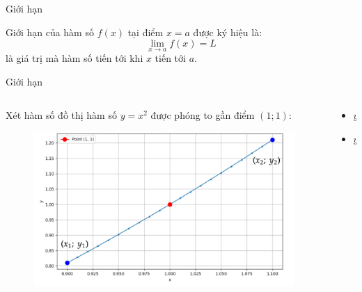 \begin{frame}{Giới hạn}
    \begin{tcolorbox}[colback=blue!10, colframe=blue!50!black, title=Định nghĩa]
    Giới hạn của hàm số \(f(x)\) tại điểm \(x=a\) được ký hiệu là:
    \begin{equation}
        \lim_{x \to a} f(x) = L
    \end{equation}
    là giá trị mà hàm số tiến tới khi \(x\) tiến tới \(a\).
    \end{tcolorbox}
\end{frame}
\newpage
\begin{frame}{Giới hạn}
    \begin{columns}
        \begin{column}{0.5\textwidth}
            Xét hàm số đồ thị hàm số \(y=x^2\) được phóng to gần điểm \((1; 1)\):
            \begin{figure}
            \centering
            \includegraphics[width=1\textwidth]{Slides/figure/0.9-1.1.png}
            \end{figure}
        \end{column}
        \begin{column}{0.5\textwidth}
            \begin{itemize}
            \item \(y_1=x_1 ^2\) 
            \item \(y_2=x_2 ^2\)
            \end{itemize}
        \end{column}
    \end{columns}
\end{frame}
\newpage

